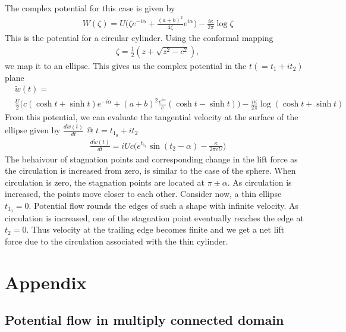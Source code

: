 \documentclass[11pt,a4paper]{article}
\newcommand{\1}{\vect{1}}
\begin{document}
The complex potential for this case is given by 
\begin{align*}
&W(\zeta) = U\bigg(\zeta e^{-i\alpha} + \frac{(a+b)^2}{4\zeta} e^{i\alpha}\bigg) - \frac{i\kappa}{2\pi} \log\zeta
\end{align*}
This is the potential for a circular cylinder. Using the conformal mapping
\begin{align*}
&\zeta = \frac{1}{2}(z+\sqrt{z^2-c^2}), \tag{$c^2 = a^2 - b^2$}
\end{align*}
we map it to an ellipse. This gives us the complex potential in the $t (=t_1+it_2)$ plane
\begin{align*}
&\tilde{w}(t) =\\
& \frac{U}{2}\bigg(c (\cosh t + \sinh t) e^{-i\alpha} + (a+b)^2\frac{e^{i\alpha}}{c} (\cosh t - \sinh t)\bigg) - \frac{i\kappa}{2\pi}\log(\cosh t + \sinh t)
\end{align*}
From this potential, we can evaluate the tangential velocity at the surface of the ellipse given by $\frac{d\tilde{w}(t)}{dt}$ @ $t=t_{1_0} + it_2$
\begin{align*}
&\frac{d\tilde{w}(t)}{dt} = iUc\bigg(e^{t_{1_0}}\sin(t_2-\alpha) - \frac{\kappa}{2\pi c U} \bigg)
\end{align*}
The behaivour of stagnation points and corresponding change in the lift force as the circulation is increased from zero, is similar to the case of the sphere. When circulation is zero, the stagnation points are located at $\pi \pm \alpha$. As circulation is increased, the points move closer to each other. Consider now, a thin ellipse $t_{1_0} = 0$. Potential flow rounds the edges of such a shape with infinite velocity. As circulation is increased, one of the stagnation point eventually reaches the edge at $t_2 = 0$. Thus velocity at the trailing edge becomes finite and we get a net lift force due to the circulation associated with the thin cylinder. 


\section{Appendix}
\subsection{Potential flow in multiply connected domain}
\end{document}
